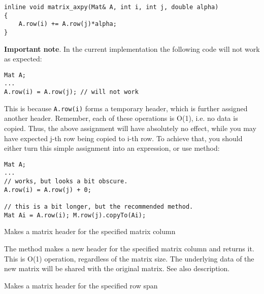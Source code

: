 \begin{lstlisting}
inline void matrix_axpy(Mat& A, int i, int j, double alpha)
{
    A.row(i) += A.row(j)*alpha;
}
\end{lstlisting}

\textbf{Important note}. In the current implementation the following code will not work as expected:
\begin{lstlisting}
Mat A;
...
A.row(i) = A.row(j); // will not work
\end{lstlisting}

This is because \texttt{A.row(i)} forms a temporary header, which is further assigned another header. Remember, each of these operations is O(1), i.e. no data is copied. Thus, the above assignment will have absolutely no effect, while you may have expected j-th row being copied to i-th row. To achieve that, you should either turn this simple assignment into an expression, or use  method:

\begin{lstlisting}
Mat A;
...
// works, but looks a bit obscure.
A.row(i) = A.row(j) + 0;

// this is a bit longer, but the recommended method.
Mat Ai = A.row(i); M.row(j).copyTo(Ai);
\end{lstlisting}


Makes a matrix header for the specified matrix column

\begin{description}
\end{description}

The method makes a new header for the specified matrix column and returns it. This is O(1) operation, regardless of the matrix size. The underlying data of the new matrix will be shared with the original matrix. See also  description.


Makes a matrix header for the specified row span

\begin{description}
\end{description}

